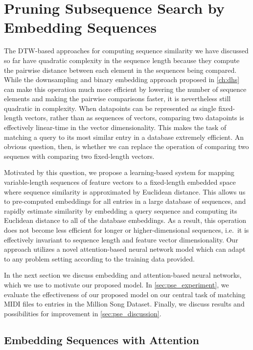 \chapter{Pruning Subsequence Search by Embedding Sequences}
\label{ch:embedding}

The DTW-based approaches for computing sequence similarity we have discussed so far have quadratic complexity in the sequence length because they compute the pairwise distance between each element in the sequences being compared.
While the downsampling and binary embedding approach proposed in \cref{ch:dhs} can make this operation much more efficient by lowering the number of sequence elements and making the pairwise comparisons faster, it is nevertheless still quadratic in complexity.
When datapoints can be represented as single fixed-length vectors, rather than as sequences of vectors, comparing two datapoints is effectively linear-time in the vector dimensionality.
This makes the task of matching a query to its most similar entry in a database extremely efficient.
An obvious question, then, is whether we can replace the operation of comparing two sequenes with comparing two fixed-length vectors.

Motivated by this question, we propose a learning-based system for mapping variable-length sequences of feature vectors to a fixed-length embedded space where sequence similarity is approximated by Euclidean distance.
This allows us to pre-computed embeddings for all entries in a large database of sequences, and rapidly estimate similarity by embedding a query sequence and computing its Euclidean distance to all of the database embeddings.
As a result, this operation does not become less efficient for longer or higher-dimensional sequences, i.e.\ it is effectively invariant to sequence length and feature vector dimensionality.
Our approach utilizes a novel attention-based neural network model which can adapt to any problem setting according to the training data provided.

In the next section we discuss embedding and attention-based neural networks, which we use to motivate our proposed model.
In \cref{sec:pse_experiment}, we evaluate the effectiveness of our proposed model on our central task of matching MIDI files to entries in the Million Song Dataset.
Finally, we discuss results and possibilities for improvement in \cref{sec:pse_discussion}.

\section{Embedding Sequences with Attention}
\label{pse:model}

